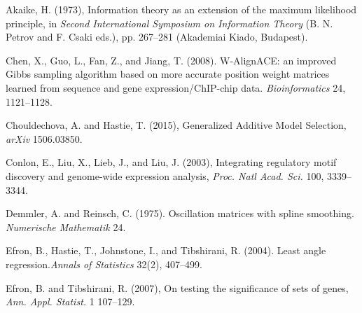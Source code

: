 \documentclass[12pt]{article} %
\theoremstyle{definition}
\begin{document}
\begin{thebibliography}{}

Akaike, H. (1973), Information theory as an extension of the maximum likelihood
principle, in {\it Second International Symposium on Information Theory} (B. N. Petrov and F. Csaki eds.), pp. 267–281 (Akademiai Kiado, Budapest).

Chen, X., Guo, L., Fan, Z., and Jiang, T. (2008). W-AlignACE: an improved Gibbs sampling algorithm
based on more accurate position weight matrices learned from sequence and gene expression/ChIP-chip
data. {\it Bioinformatics} 24, 1121–1128.

Chouldechova, A. and Hastie, T. (2015), Generalized Additive Model Selection, {\it arXiv} 1506.03850.

Conlon, E., Liu, X., Lieb, J., and Liu, J. (2003), Integrating regulatory motif discovery and genome-wide expression analysis, {\it Proc. Natl Acad. Sci.} 100, 3339--3344.

Demmler, A. and Reinsch, C. (1975). Oscillation matrices with spline smoothing. {\it Numerische Mathematik} 24.

Efron, B., Hastie, T., Johnstone, I., and Tibshirani, R. (2004). Least angle regression.{\it Annals of Statistics} 32(2), 407–499.

Efron, B. and Tibshirani, R. (2007), On testing the significance of sets of genes, {\it Ann. Appl. Statist.} 1 107–129.


\end{thebibliography}
\end{document}
